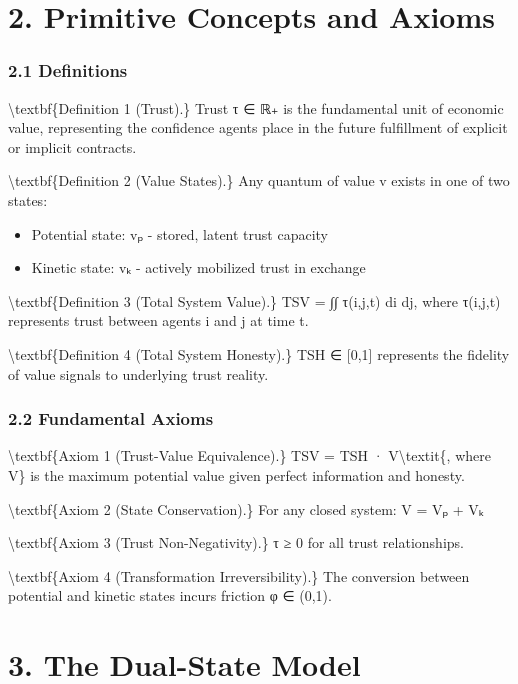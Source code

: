 \documentclass[11pt,oneside]{book}
\begin{document}
\section{2. Primitive Concepts and Axioms}

\subsubsection{2.1 Definitions}

\textbackslash textbf\{Definition 1 (Trust).\} Trust τ ∈ ℝ₊ is the fundamental unit of economic value, representing the confidence agents place in the future fulfillment of explicit or implicit contracts.

\textbackslash textbf\{Definition 2 (Value States).\} Any quantum of value v exists in one of two states:
\begin{itemize}
\item Potential state: vₚ - stored, latent trust capacity
\item Kinetic state: vₖ - actively mobilized trust in exchange
\end{itemize}

\textbackslash textbf\{Definition 3 (Total System Value).\} TSV = ∫∫ τ(i,j,t) di dj, where τ(i,j,t) represents trust between agents i and j at time t.

\textbackslash textbf\{Definition 4 (Total System Honesty).\} TSH ∈ [0,1] represents the fidelity of value signals to underlying trust reality.

\subsubsection{2.2 Fundamental Axioms}

\textbackslash textbf\{Axiom 1 (Trust-Value Equivalence).\} TSV = TSH · V\textbackslash textit\{, where V\} is the maximum potential value given perfect information and honesty.

\textbackslash textbf\{Axiom 2 (State Conservation).\} For any closed system: V = Vₚ + Vₖ

\textbackslash textbf\{Axiom 3 (Trust Non-Negativity).\} τ ≥ 0 for all trust relationships.

\textbackslash textbf\{Axiom 4 (Transformation Irreversibility).\} The conversion between potential and kinetic states incurs friction φ ∈ (0,1).

\section{3. The Dual-State Model}
\end{document}
